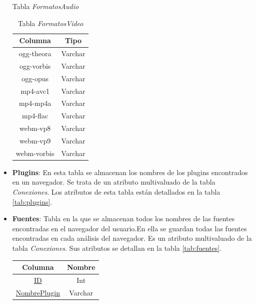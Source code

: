 \begin{itemize}
\begin{table}[tbp]
\begin{minipage}[c]{70mm}
            \caption{Tabla \textit{FormatosAudio}}
            \label{tab:formatosAudio}
        \end{minipage}
        \begin{minipage}[c]{70mm}
        \centering
            \begin{tabular}{c|c}
                \textbf{Columna} & \textbf{Tipo} \\ \hline
                ogg-theora & Varchar\\
                ogg-vorbis & Varchar\\
                ogg-opus & Varchar\\
                mp4-avc1 & Varchar\\
                mp4-mp4a & Varchar\\
                mp4-flac & Varchar\\
                webm-vp8 & Varchar\\
                webm-vp9 & Varchar\\
                webm-vorbis & Varchar\\
            \end{tabular}
            \caption{Tabla \textit{FormatosVideo}}
            \label{tab:formatosVideo}
        \end{minipage}
    \end{table}
    \item \textbf{Plugins}: En esta tabla se almacenan los nombres de los plugins encontrados en un navegador. Se trata de un atributo multivaluado de la tabla \textit{Conexiones}. Los atributos de esta tabla están detallados en la tabla \ref{tab:plugins}.
    \newpage
    \item \textbf{Fuentes}: Tabla en la que se almacenan todos los nombres de las fuentes encontradas en el navegador del usuario.En ella se guardan todas las fuentes encontradas en cada análisis del navegador. Es un atributo multivaluado de la tabla \textit{Conexiones}. Sus atributos se detallan en la tabla \ref{tab:fuentes}.
    \begin{table}[h]
    \centering
        \begin{minipage}[c]{70mm}
        \centering
            \begin{tabular}{c|c}
                \textbf{Columna} & \textbf{Nombre} \\ \hline
                \underline{ID} & Int \\
                \underline{NombrePlugin} & Varchar\\
            \end{tabular}

\end{minipage}
\end{table}
\end{itemize}
